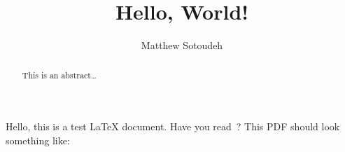 \documentclass{article}
\title{Hello, World!}
\author{Matthew Sotoudeh}
\begin{document}
\maketitle

\begin{abstract}
    This is an abstract\ldots
\end{abstract}

Hello, this is a test \LaTeX{} document. Have you read~\citet{bmc}? This PDF
should look something like:

\begin{center}
\end{center}


\end{document}
